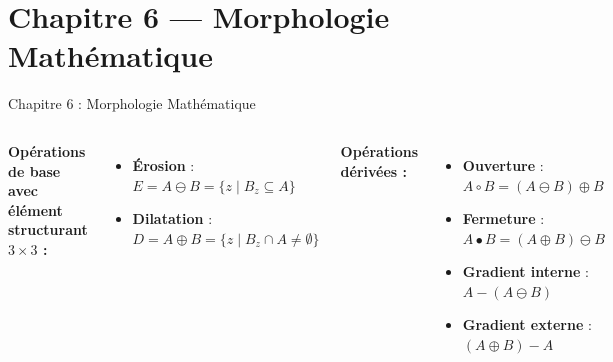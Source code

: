 \documentclass[aspectratio=169, 11pt]{beamer}
\begin{document}
\section{Chapitre 6 — Morphologie Mathématique}

\begin{frame}{Chapitre 6 : Morphologie Mathématique}
  \begin{columns}[T]
    \textbf{\textcolor{uy1blue}{Opérations de base avec élément structurant $3\times 3$ :}}
    \vspace{4pt}
    \begin{itemize}
      \item \textbf{Érosion} : $E = A \ominus B = \{z \mid B_z \subseteq A\}$
      \item \textbf{Dilatation} : $D = A \oplus B = \{z \mid B_z \cap A \neq \emptyset\}$
    \end{itemize}
    \vspace{6pt}
    \textbf{\textcolor{uy1purple}{Opérations dérivées :}}
    \begin{itemize}
      \item \textbf{Ouverture} : $A \circ B = (A \ominus B) \oplus B$
      \item \textbf{Fermeture} : $A \bullet B = (A \oplus B) \ominus B$
      \item \textbf{Gradient interne} : $A - (A \ominus B)$
      \item \textbf{Gradient externe} : $(A \oplus B) - A$
    \end{itemize}

  \end{columns}
\end{frame}

\end{document}
